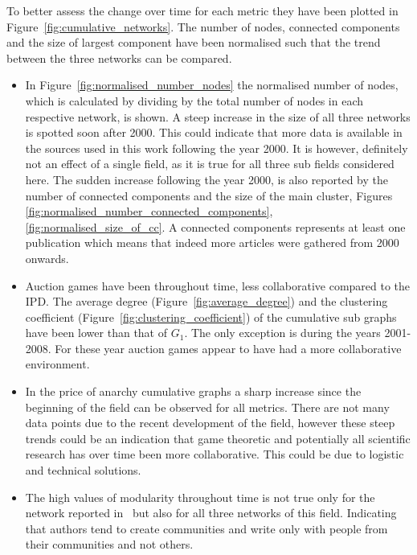\documentclass{article}
\theoremstyle{definition}
\begin{document}
\begin{table}[!hbtp]
    \centering
    \begin{adjustbox}{totalheight=\baselineskip, width=\textwidth}
    }
    \caption{Collaborativeness metrics for cumulative graphs' main clusters, \(G \subseteq \bar{G}_1\).}\label{table:clusters_cumulative}
\end{adjustbox}
\end{table}

To better assess the change over time for each metric they have been plotted in
Figure~\ref{fig:cumulative_networks}. The number of nodes, connected components
and the size of largest component have been normalised such that the trend between
the three networks can be compared.

\begin{itemize}
    \item In Figure~\ref{fig:normalised_number_nodes} the normalised number of nodes,
    which is calculated by dividing by the total number of nodes in each respective network,
    is shown. A steep increase in the size of all three networks is spotted soon after
    2000. This could indicate that more data is available in the sources
    used in this work following the year 2000. It is however, definitely not an effect
    of a single field, as it is true for all three sub fields considered here.
    The sudden increase following the year 2000, is also reported by the
    number of connected components and the size of the main cluster, Figures
    \ref{fig:normalised_number_connected_components}, \ref{fig:normalised_size_of_cc}.
    A connected components represents at least one publication which means that indeed
    more articles were gathered from 2000 onwards.
    \item Auction games have been throughout time, less collaborative compared
    to the IPD. The average degree (Figure~\ref{fig:average_degree})
    and the clustering coefficient (Figure~\ref{fig:clustering_coefficient}) of 
    the cumulative sub graphs have been lower than that of \(G_1\).
    The only exception is during the years 2001-2008. For these
    year auction games appear to have had a more collaborative environment.
    \item In the price of anarchy cumulative graphs a sharp increase since the 
    beginning of the field can be observed for all metrics. There are not
    many data points due to the recent development of the field, however
    these steep trends could be an indication that game theoretic and potentially
    all scientific research has over time been more collaborative. This could
    be due to logistic and technical solutions.
    \item The high values of modularity throughout time is not true only for the
    network reported in~\cite{Liu2015} but also for all three networks of this
    field. Indicating that authors tend to create communities and write only
    with people from their communities and not others.
\end{itemize}
\end{document}
